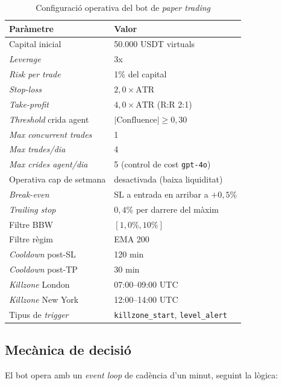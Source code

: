\documentclass[12pt, a4paper]{report}
\begin{document}
\begin{table}[H]
\centering
\caption{Configuració operativa del bot de \textit{paper trading}}
\label{tab:botconfig}
\begin{tabular}{@{}L{5.5cm}L{7.5cm}@{}}
\toprule
\textbf{Paràmetre} & \textbf{Valor} \\
\midrule
Capital inicial               & 50.000 USDT virtuals \\
\textit{Leverage}             & 3x \\
\textit{Risk per trade}       & 1\% del capital \\
\textit{Stop-loss}            & $2{,}0 \times \mathrm{ATR}$ \\
\textit{Take-profit}          & $4{,}0 \times \mathrm{ATR}$ (R:R 2:1) \\
\textit{Threshold} crida agent & $|\mathrm{Confluence}| \geq 0{,}30$ \\
\textit{Max concurrent trades} & 1 \\
\textit{Max trades/dia}        & 4 \\
\textit{Max crides agent/dia}  & 5 (control de cost \texttt{gpt-4o}) \\
Operativa cap de setmana       & desactivada (baixa liquiditat) \\
\textit{Break-even}            & SL a entrada en arribar a $+0{,}5\%$ \\
\textit{Trailing stop}         & $0{,}4\%$ per darrere del màxim \\
Filtre BBW                     & $[1{,}0\%, 10\%]$ \\
Filtre règim                   & EMA 200 \\
\textit{Cooldown} post-SL      & 120 min \\
\textit{Cooldown} post-TP      & 30 min \\
\textit{Killzone} London       & 07:00--09:00 UTC \\
\textit{Killzone} New York     & 12:00--14:00 UTC \\
Tipus de \textit{trigger}      & \texttt{killzone\_start}, \texttt{level\_alert} \\
\bottomrule
\end{tabular}
\end{table}

\subsection{Mecànica de decisió}

El bot opera amb un \textit{event loop} de cadència d'un minut, seguint la lògica:
\end{document}
